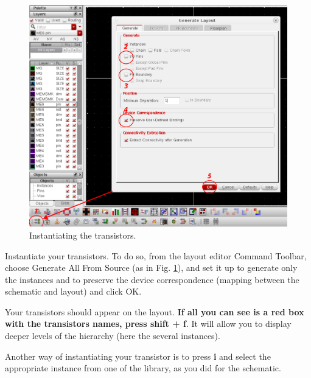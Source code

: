 	\begin{itemize}
\parbox[t]{\dimexpr\textwidth-\leftmargin}{%
	\begin{figure}
		\vspace{-6mm}
		\centering
		\vspace{-\baselineskip}
		\includegraphics[scale=0.3]{figures/lab2_layout/layout_inst}
		\caption{Instantiating the transistors.}
		\label{layout_inst}
	\end{figure}
		\item Instantiate your transistors. To do so, from the layout editor Command Toolbar, choose Generate All From Source (as in Fig. \ref{layout_inst}), and set it up to generate only the instances and to preserve the device correspondence (mapping between the schematic and layout) and click OK.
		\item Your transistors should appear on the layout. \textbf{If all you can see is a red box with the transistors names, press \textbf{shift + f}}. It will allow you to display deeper levels of the hierarchy (here the several instances).}
	\end{itemize}


\begin{remark}
	Another way of instantiating your transistor is to press \textbf{i} and select the appropriate instance from one of the library, as you did for the schematic.
\end{remark}

